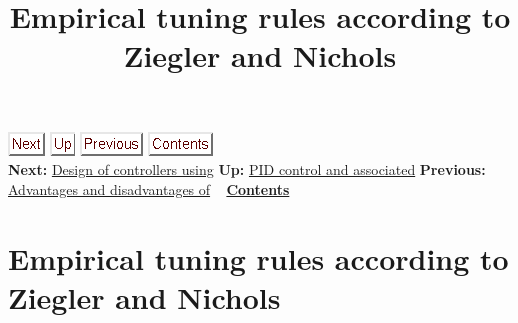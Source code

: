 \documentclass[]{article}
\title{Empirical tuning rules according to Ziegler and Nichols}
\date{}
\begin{document}
\maketitle

\href{http://www.atp.ruhr-uni-bochum.de/rt1/syscontrol/node65.html}{\includegraphics[width=0.38542in,height=0.25000in]{./Empirical tuning rules according to Ziegler and Nichols_files/next.png}}
\href{http://www.atp.ruhr-uni-bochum.de/rt1/syscontrol/node60.html}{\includegraphics[width=0.27083in,height=0.25000in]{./Empirical tuning rules according to Ziegler and Nichols_files/up.png}}
\href{http://www.atp.ruhr-uni-bochum.de/rt1/syscontrol/node63.html}{\includegraphics[width=0.65625in,height=0.25000in]{./Empirical tuning rules according to Ziegler and Nichols_files/prev.png}}
\href{http://www.atp.ruhr-uni-bochum.de/rt1/syscontrol/node1.html}{\includegraphics[width=0.67708in,height=0.25000in]{./Empirical tuning rules according to Ziegler and Nichols_files/contents.png}}\\
\textbf{Next:}
\href{http://www.atp.ruhr-uni-bochum.de/rt1/syscontrol/node65.html}{Design
of controllers using} \textbf{Up:}
\href{http://www.atp.ruhr-uni-bochum.de/rt1/syscontrol/node60.html}{PID
control and associated} \textbf{Previous:}
\href{http://www.atp.ruhr-uni-bochum.de/rt1/syscontrol/node63.html}{Advantages
and disadvantages of} ~
\textbf{\href{http://www.atp.ruhr-uni-bochum.de/rt1/syscontrol/node1.html}{Contents}}\\[2\baselineskip]

\section[ Empirical tuning rules according to Ziegler and
Nichols]{\texorpdfstring{\protect\hypertarget{SECTION00940000000000000000}{}{}
\protect\hypertarget{16224}{}{} \protect\hypertarget{16225}{}{}
\protect\hypertarget{16226}{}{}\protect\hypertarget{16227}{}{}
\protect\hypertarget{sec:empir-einst-nach8.2.3.1}{}{} Empirical tuning
rules according to Ziegler and
Nichols}{     Empirical tuning rules according to Ziegler and Nichols}}\label{empirical-tuning-rules-according-to-ziegler-and-nichols}
\end{document}
